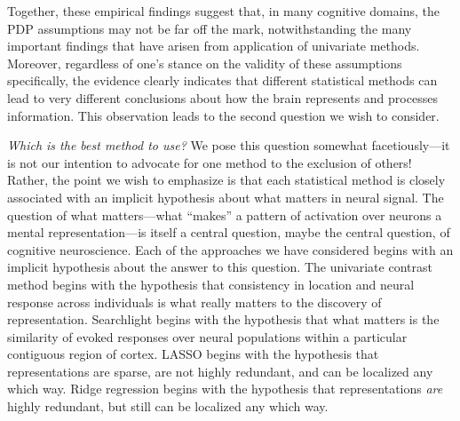 Together, these empirical findings suggest that, in many cognitive domains, the PDP assumptions may not be far off the mark, notwithstanding the many important findings that have arisen from application of univariate methods. Moreover, regardless of one's stance on the validity of these assumptions specifically, the evidence clearly indicates that different statistical methods can lead to very different conclusions about how the brain represents and processes information. This observation leads to the second question we wish to consider.

{\em Which is the best method to use?} We pose this question somewhat facetiously---it is not our intention to advocate for one method to the exclusion of others! Rather, the point we wish to emphasize is that each statistical method is closely associated with an implicit hypothesis about what matters in neural signal. The question of what matters---what ``makes'' a pattern of activation over neurons a mental representation---is itself a central question, maybe the central question, of cognitive neuroscience. Each of the approaches we have considered begins with an implicit hypothesis about the answer to this question. The univariate contrast method begins with the hypothesis that consistency in location and neural response across individuals is what really matters to the discovery of representation. Searchlight begins with the hypothesis that what matters is the similarity of evoked responses over neural populations within a particular contiguous region of cortex. LASSO begins with the hypothesis that representations are sparse, are not highly redundant, and can be localized any which way. Ridge regression begins with the hypothesis that representations {\em are} highly redundant, but still can be localized any which way.

